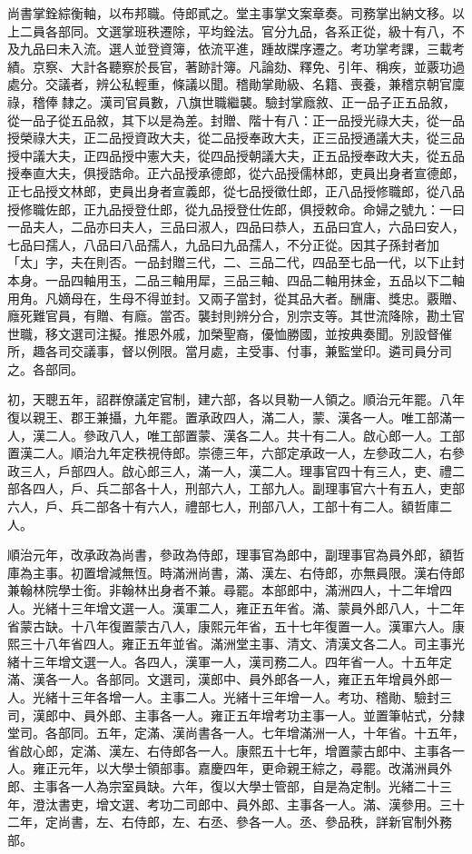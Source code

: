 \begin{pinyinscope}
尚書掌銓綜衡軸，以布邦職。侍郎貳之。堂主事掌文案章奏。司務掌出納文移。以上二員各部同。文選掌班秩遷除，平均銓法。官分九品，各系正從，級十有八，不及九品曰未入流。選人並登資簿，依流平進，踵故牒序遷之。考功掌考課，三載考績。京察、大計各聽察於長官，著跡計簿。凡論劾、釋免、引年、稱疾，並覈功過處分。交議者，辨公私輕重，條議以聞。稽勛掌勛級、名籍、喪養，兼稽京朝官廩祿，稽俸隸之。漢司官員數，八旗世職繼襲。驗封掌廕敘、正一品子正五品敘，從一品子從五品敘，其下以是為差。封贈、階十有八：正一品授光祿大夫，從一品授榮祿大夫，正二品授資政大夫，從二品授奉政大夫，正三品授通議大夫，從三品授中議大夫，正四品授中憲大夫，從四品授朝議大夫，正五品授奉政大夫，從五品授奉直大夫，俱授誥命。正六品授承德郎，從六品授儒林郎，吏員出身者宣德郎，正七品授文林郎，吏員出身者宣義郎，從七品授徵仕郎，正八品授修職郎，從八品授修職佐郎，正九品授登仕郎，從九品授登仕佐郎，俱授敕命。命婦之號九：一曰一品夫人，二品亦曰夫人，三品曰淑人，四品曰恭人，五品曰宜人，六品曰安人，七品曰孺人，八品曰八品孺人，九品曰九品孺人，不分正從。因其子孫封者加「太」字，夫在則否。一品封贈三代，二、三品二代，四品至七品一代，以下止封本身。一品四軸用玉，二品三軸用犀，三品三軸、四品二軸用抹金，五品以下二軸用角。凡嫡母在，生母不得並封。又兩子當封，從其品大者。酬庸、獎忠。覈贈、廕死難官員，有贈、有廕。當否。襲封則辨分合，別宗支等。其世流降除，勘土官世職，移文選司注擬。推恩外戚，加榮聖裔，優恤勝國，並按典奏聞。別設督催所，趣各司交議事，督以例限。當月處，主受事、付事，兼監堂印。遴司員分司之。各部同。

初，天聰五年，詔群僚議定官制，建六部，各以貝勒一人領之。順治元年罷。八年復以親王、郡王兼攝，九年罷。置承政四人，滿二人，蒙、漢各一人。唯工部滿一人，漢二人。參政八人，唯工部置蒙、漢各二人。共十有二人。啟心郎一人。工部置漢二人。順治九年定秩視侍郎。崇德三年，六部定承政一人，左參政二人，右參政三人，戶部四人。啟心郎三人，滿一人，漢二人。理事官四十有三人，吏、禮二部各四人，戶、兵二部各十人，刑部六人，工部九人。副理事官六十有五人，吏部六人，戶、兵二部各十有六人，禮部七人，刑部八人，工部十有二人。額哲庫二人。

順治元年，改承政為尚書，參政為侍郎，理事官為郎中，副理事官為員外郎，額哲庫為主事。初置增減無恆。時滿洲尚書，滿、漢左、右侍郎，亦無員限。漢右侍郎兼翰林院學士銜。非翰林出身者不兼。尋罷。本部郎中，滿洲四人，十二年增四人。光緒十三年增文選一人。漢軍二人，雍正五年省。滿、蒙員外郎八人，十二年省蒙古缺。十八年復置蒙古八人，康熙元年省，五十七年復置一人。漢軍六人。康熙三十八年省四人。雍正五年並省。滿洲堂主事、清文、清漢文各二人。司主事光緒十三年增文選一人。各四人，漢軍一人，漢司務二人。四年省一人。十五年定滿、漢各一人。各部同。文選司，漢郎中、員外郎各一人，雍正五年增員外郎一人。光緒十三年各增一人。主事二人。光緒十三年增一人。考功、稽勛、驗封三司，漢郎中、員外郎、主事各一人。雍正五年增考功主事一人。並置筆帖式，分隸堂司。各部同。五年，定滿、漢尚書各一人。七年增滿洲一人，十年省。十五年，省啟心郎，定滿、漢左、右侍郎各一人。康熙五十七年，增置蒙古郎中、主事各一人。雍正元年，以大學士領部事。嘉慶四年，更命親王綜之，尋罷。改滿洲員外郎、主事各一人為宗室員缺。六年，復以大學士管部，自是為定制。光緒二十三年，澄汰書吏，增文選、考功二司郎中、員外郎、主事各一人。滿、漢參用。三十二年，定尚書，左、右侍郎，左、右丞、參各一人。丞、參品秩，詳新官制外務部。


\end{pinyinscope}
